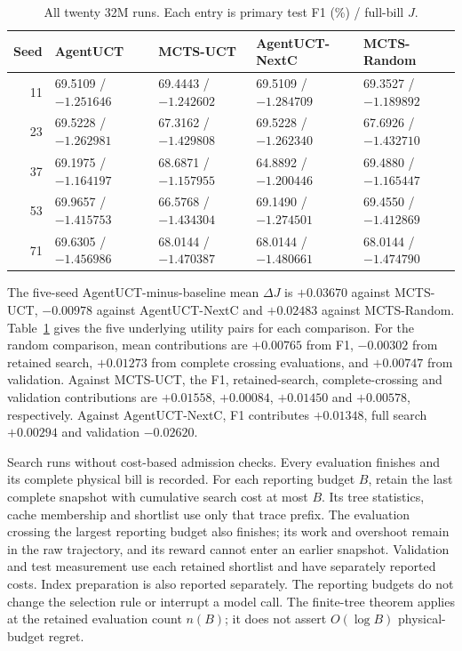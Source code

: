 \begin{table}[t]
\centering\small
\caption{All twenty 32M runs. Each entry is primary test F1 (\%) / full-bill $J$.}
\label{tab:all-seeds}
\begin{tabular}{rllll}
\toprule
Seed & AgentUCT & MCTS-UCT & AgentUCT-NextC & MCTS-Random\\
\midrule
11 & 69.5109 / $-1.251646$ & 69.4443 / $-1.242602$ & 69.5109 / $-1.284709$ & 69.3527 / $-1.189892$\\
23 & 69.5228 / $-1.262981$ & 67.3162 / $-1.429808$ & 69.5228 / $-1.262340$ & 67.6926 / $-1.432710$\\
37 & 69.1975 / $-1.164197$ & 68.6871 / $-1.157955$ & 64.8892 / $-1.200446$ & 69.4880 / $-1.165447$\\
53 & 69.9657 / $-1.415753$ & 66.5768 / $-1.434304$ & 69.1490 / $-1.274501$ & 69.4550 / $-1.412869$\\
71 & 69.6305 / $-1.456986$ & 68.0144 / $-1.470387$ & 68.0144 / $-1.480661$ & 68.0144 / $-1.474790$\\
\bottomrule
\end{tabular}
\end{table}

The five-seed AgentUCT-minus-baseline mean $\Delta J$ is
$+0.03670$ against MCTS-UCT, $-0.00978$ against AgentUCT-NextC and
$+0.02483$ against MCTS-Random. Table~\ref{tab:all-seeds} gives the five underlying
utility pairs for each comparison.
For the random comparison, mean contributions are $+0.00765$ from F1,
$-0.00302$ from retained search, $+0.01273$ from complete crossing evaluations,
and $+0.00747$ from validation. Against MCTS-UCT, the F1, retained-search,
complete-crossing and validation contributions are $+0.01558$, $+0.00084$,
$+0.01450$ and $+0.00578$, respectively. Against AgentUCT-NextC, F1 contributes
$+0.01348$, full search $+0.00294$ and validation $-0.02620$.

Search runs without cost-based admission checks. Every evaluation finishes and
its complete physical bill is recorded. For each reporting budget $B$, retain
the last complete snapshot with cumulative search cost at most $B$. Its tree
statistics, cache membership and shortlist use only that trace prefix.
The evaluation crossing the largest reporting budget also finishes; its work
and overshoot remain in the raw trajectory, and its reward cannot enter an
earlier snapshot. Validation and test measurement use each retained shortlist
and have separately reported costs. Index preparation is also reported
separately. The reporting budgets do not change the selection rule or interrupt
a model call. The finite-tree theorem applies at the retained evaluation
count $n(B)$; it does not assert $O(\log B)$ physical-budget regret.

